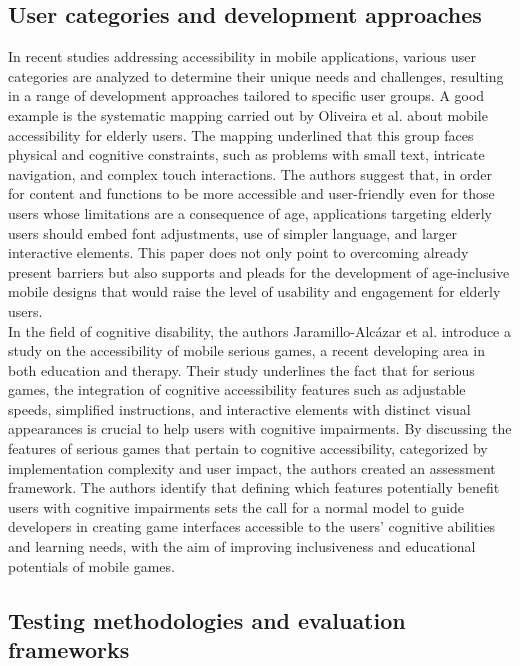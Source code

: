 \subsection{User categories and development approaches}

In recent studies addressing accessibility in mobile applications, various user categories are analyzed to determine their unique needs and challenges, resulting in a range of development approaches tailored to specific user groups.
A good example is the systematic mapping carried out by Oliveira et al. \cite{oliveira2018elderly} about mobile accessibility for elderly users. The mapping underlined that this group faces physical and cognitive constraints, such as problems with small text, intricate navigation, and complex touch interactions. The authors suggest that, in order for content and functions to be more accessible and user-friendly even for those users whose limitations are a consequence of age, applications targeting elderly users should embed font adjustments, use of simpler language, and larger interactive elements. This paper does not only point to overcoming already present barriers but also supports and pleads for the development of age-inclusive mobile designs that would raise the level of usability and engagement for elderly users. \\

In the field of cognitive disability, the authors Jaramillo-Alcázar et al. \cite{jaramillo2017cognitive} introduce a study on the accessibility of mobile serious games, a recent developing area in both education and therapy. Their study underlines the fact that for serious games, the integration of cognitive accessibility features such as adjustable speeds, simplified instructions, and interactive elements with distinct visual appearances is crucial to help users with cognitive impairments. By discussing the features of serious games that pertain to cognitive accessibility, categorized by implementation complexity and user impact, the authors created an assessment framework. The authors identify that defining which features potentially benefit users with cognitive impairments sets the call for a normal model to guide developers in creating game interfaces accessible to the users' cognitive abilities and learning needs, with the aim of improving inclusiveness and educational potentials of mobile games.

\subsection{Testing methodologies and evaluation frameworks}

